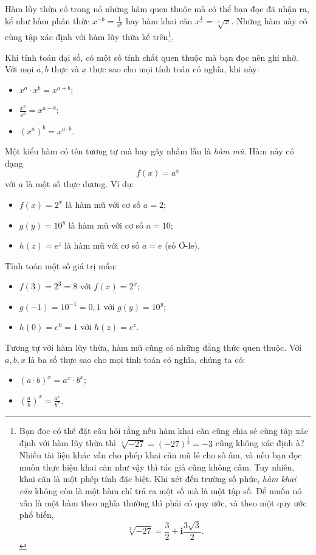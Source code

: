 \documentclass[a4paper, titlepage, openany]{book}
\begin{document}
Hàm lũy thừa có trong nó những hàm quen thuộc mà có thể bạn đọc đã nhận ra, kể như hàm phân thức $x^{-b} = \frac{1}{x^b}$ hay hàm khai căn $x^{\frac{1}{c}} = \sqrt[n]{x}$. Những hàm này có cùng tập xác định với hàm lũy thừa kể trên\footnote{Bạn đọc có thể đặt câu hỏi rằng nếu hàm khai căn cũng chia sẻ cùng tập xác định với hàm lũy thừa thì $\sqrt[3]{-27} = (-27)^{\frac{1}{3}} = -3$ cũng không xác định à? Nhiều tài liệu khác vẫn cho phép khai căn mũ lẻ cho số âm, và nếu bạn đọc muốn thực hiện khai căn như vậy thì tác giả cũng không cấm. Tuy nhiên, khai căn là một phép tính đặc biệt. Khi xét đến trường số phức, \textit{hàm khai căn} không còn là một hàm chỉ trả ra một số mà là một tập số. Để muốn nó vẫn là một hàm theo nghĩa thường thì phải có quy ước, và theo một quy ước phổ biến, $$\sqrt[3]{-27} = \frac{3}{2} + \mathbf{i}\frac{3\sqrt{3}}{2}.$$}.

Khi tính toán đại số, có một số tính chất quen thuộc mà bạn đọc nên ghi nhớ. Với mọi $a, b$ thực và $x$ thực sao cho mọi tính toán có nghĩa, khi này:
\begin{itemize}
   \item $x^a\cdot x^b = x^{a+b}$;
   \item $\frac{x^a}{x^b} = x^{a - b}$;
   \item $(x^a)^b = x^{a\cdot b}$.
\end{itemize}

Một kiểu hàm có tên tương tự mà hay gây nhầm lẫn là \emph{hàm mũ}. Hàm này có dạng $$f(x) = a^x$$ với $a$ là một số thực dương. Ví dụ:
\begin{itemize}
   \item $f(x) = 2^x$ là hàm mũ với cơ số $a = 2$;
   \item $g(y) = 10^y$ là hàm mũ với cơ số $a = 10$;
   \item $h(z) = e^z$ là hàm mũ với cơ số $a = e$ (số Ơ-le).
\end{itemize}
Tính toán một số giá trị mẫu:
\begin{itemize}
   \item $f(3) = 2^3 = 8$ với $f(x) = 2^x$;
   \item $g(-1) = 10^{-1} = 0,1$ với $g(y) = 10^y$;
   \item $h(0) = e^0 = 1$ với $h(z) = e^z$.
\end{itemize}
Tương tự với hàm lũy thừa, hàm mũ cũng có những đẳng thức quen thuộc. Với $a, b, x$ là ba số thực sao cho mọi tính toán có nghĩa, chúng ta có:
\begin{itemize}
   \item $(a\cdot b)^x=a^x\cdot b^x$;
   \item $\left(\frac{a}{b}\right)^x = \frac{a^x}{b^x}$.
\end{itemize}
\end{document}
